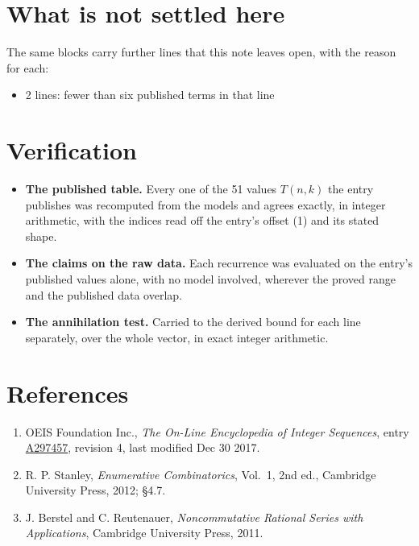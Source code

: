 \documentclass[11pt]{article}
\theoremstyle{definition}
\begin{document}
\section{What is not settled here}

The same blocks carry further lines that this note leaves open, with the reason for each:

\begin{itemize}

\item 2 lines: fewer than six published terms in that line

\end{itemize}

\section{Verification}

\begin{itemize}

\item {\bfseries The published table.} Every one of the 51 values $T(n,k)$ the entry publishes was recomputed from the models and agrees exactly, in integer arithmetic, with the indices read off the entry's offset (1) and its stated shape.

\item {\bfseries The claims on the raw data.} Each recurrence was evaluated on the entry's published values alone, with no model involved, wherever the proved range and the published data overlap.

\item {\bfseries The annihilation test.} Carried to the derived bound for each line separately, over the whole vector, in exact integer arithmetic.

\end{itemize}

\section{References}

\begin{enumerate}

\item OEIS Foundation Inc., \emph{The On-Line Encyclopedia of Integer Sequences}, entry \href{https://oeis.org/A297457}{A297457}, revision 4, last modified Dec 30 2017.

\item R. P. Stanley, \emph{Enumerative Combinatorics}, Vol.~1, 2nd ed., Cambridge University Press, 2012; \S4.7.

\item J. Berstel and C. Reutenauer, \emph{Noncommutative Rational Series with Applications}, Cambridge University Press, 2011.

\end{enumerate}
\end{document}
